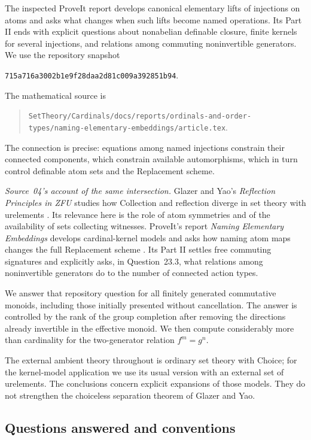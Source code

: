 \documentclass[11pt,letterpaper]{article}
\numberwithin{equation}{section}
\theoremstyle{plain}
\theoremstyle{definition}
\theoremstyle{remark}
\begin{document}
The inspected ProveIt report \cite{RepoNamingIII} develops canonical elementary
lifts of injections on atoms and asks what changes when such lifts become named
operations. Its Part II ends with explicit questions about nonabelian definable
closure, finite kernels for several injections, and relations among commuting
noninvertible generators. We use the repository snapshot
\begin{center}
\texttt{715a716a3002b1e9f28daa2d81c009a392851b94}.
\end{center}
The mathematical source is
\begin{quote}\small\raggedright
\nolinkurl{SetTheory/Cardinals/docs/reports/ordinals-and-order-types/naming-elementary-embeddings/article.tex}.
\end{quote}
The connection is precise: equations among named injections constrain their
connected components, which constrain available automorphisms, which in turn
control definable atom sets and the Replacement scheme.

\emph{Source~04's account of the same intersection.}
Glazer and Yao's \emph{Reflection Principles in ZFU} studies how
Collection and reflection diverge in set theory with urelements
\cite{GY2026}. Its relevance here is the role of atom symmetries and
of the availability of sets collecting witnesses. ProveIt's report
\emph{Naming Elementary Embeddings} develops cardinal-kernel models and
asks how naming atom maps changes the full Replacement scheme
\cite{RepoNamingIII}. Its Part II settles free commuting signatures and explicitly
asks, in Question~23.3, what relations among noninvertible generators do
to the number of connected action types.

We answer that repository question for all finitely generated
commutative monoids, including those initially presented without
cancellation. The answer is controlled by the rank of the group
completion after removing the directions already invertible in the
effective monoid. We then compute considerably more than cardinality
for the two-generator relation $f^m=g^n$.

The external ambient theory throughout is ordinary set theory with
Choice; for the kernel-model application we use its usual version with
an external set of urelements. The conclusions concern explicit
expansions of those models. They do not strengthen the choiceless
separation theorem of Glazer and Yao.

\subsection{Questions answered and conventions}
\end{document}
